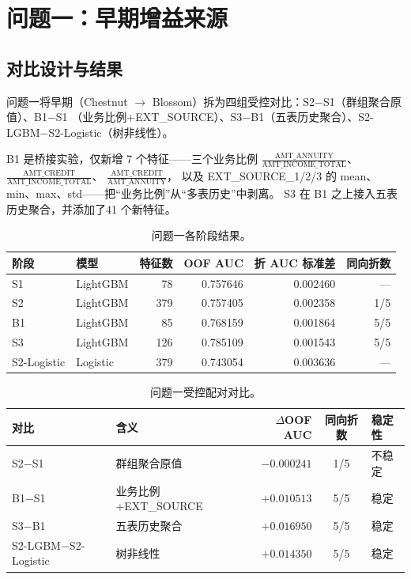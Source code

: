 \documentclass[12pt,UTF8,fontset=windows]{ctexart}
\begin{document}
\section{问题一：早期增益来源}

\subsection{对比设计与结果}

问题一将早期（Chestnut $\to$ Blossom）拆为四组受控对比：S2$-$S1（群组聚合原值）、B1$-$S1
（业务比例+EXT\_SOURCE）、S3$-$B1（五表历史聚合）、S2-LGBM$-$S2-Logistic（树非线性）。

{
B1 是桥接实验，仅新增 7 个特征——三个业务比例
$\frac{\text{AMT\_ANNUITY}}{\text{AMT\_INCOME\_TOTAL}}$、
$\frac{\text{AMT\_CREDIT}}{\text{AMT\_INCOME\_TOTAL}}$、
$\frac{\text{AMT\_CREDIT}}{\text{AMT\_ANNUITY}}$，
以及 EXT\_SOURCE\_1/2/3 的 mean、min、max、std——把“业务比例”从“多表历史”中剥离。
S3 在 B1 之上接入五表历史聚合，并添加了41 个新特征。
\par}

\begin{table}[h]
\centering\small
\caption{问题一各阶段结果。}\label{tab:rq1-stages}
\begin{tabular}{llrrrr}
\toprule
阶段 & 模型 & 特征数 & OOF AUC & 折 AUC 标准差 & 同向折数 \\
\midrule
S1 & LightGBM & 78  & 0.757646 & 0.002460 & --- \\
S2 & LightGBM & 379 & 0.757405 & 0.002358 & 1/5 \\
B1 & LightGBM & 85  & 0.768159 & 0.001864 & 5/5 \\
S3 & LightGBM & 126 & 0.785109 & 0.001543 & 5/5 \\
S2-Logistic & Logistic & 379 & 0.743054 & 0.003636 & --- \\
\bottomrule
\end{tabular}
\end{table}

\begin{table}[h]
\centering\small
\setlength{\tabcolsep}{6pt}
\caption{问题一受控配对对比。}\label{tab:rq1-deltas}
\begin{tabular}{l p{} r c p{}}
\toprule
对比 & 含义 & $\Delta$OOF AUC & 同向折数 & 稳定性 \\
\midrule
S2$-$S1 & 群组聚合原值 & $-0.000241$ & 1/5 & 不稳定 \\
B1$-$S1 & 业务比例+EXT\_SOURCE & $+0.010513$ & 5/5 & 稳定 \\
S3$-$B1 & 五表历史聚合 & $+0.016950$ & 5/5 & 稳定 \\
S2-LGBM$-$S2-Logistic & 树非线性 & $+0.014350$ & 5/5 & 稳定 \\
\bottomrule
\end{tabular}
\end{table}
\end{document}
